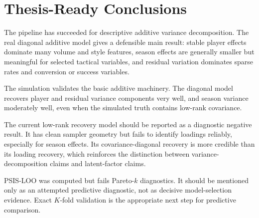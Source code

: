 \documentclass[11pt]{article}
\begin{document}
\section{Thesis-Ready Conclusions}

The pipeline has succeeded for descriptive additive variance decomposition.
The real diagonal additive model gives a defensible main result: stable player
effects dominate many volume and style features, season effects are generally
smaller but meaningful for selected tactical variables, and residual variation
dominates sparse rates and conversion or success variables.

The simulation validates the basic additive machinery. The diagonal model
recovers player and residual variance components very well, and season variance
moderately well, even when the simulated truth contains low-rank covariance.

The current low-rank recovery model should be reported as a diagnostic negative
result. It has clean sampler geometry but fails to identify loadings reliably,
especially for season effects. Its covariance-diagonal recovery is more
credible than its loading recovery, which reinforces the distinction between
variance-decomposition claims and latent-factor claims.

PSIS-LOO was computed but fails Pareto-\(k\) diagnostics. It should be
mentioned only as an attempted predictive diagnostic, not as decisive
model-selection evidence. Exact \(K\)-fold validation is the appropriate next
step for predictive comparison.
\end{document}
